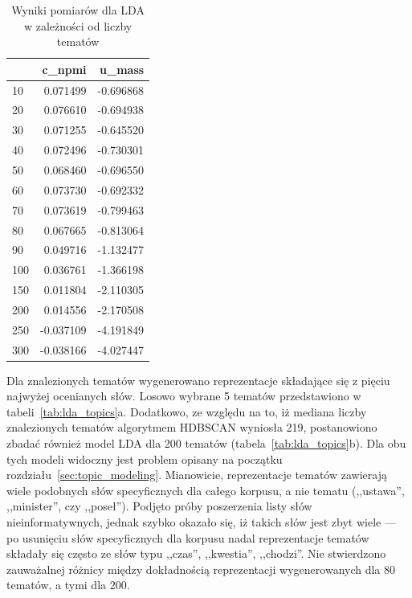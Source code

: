 	\begin{table}[htb]
		\centering
		\caption{Wyniki pomiarów dla LDA w zależności od liczby tematów}\label{tab:lda_scores}
		\begin{tabular}{lrr}
			\toprule
			{} &    c\_npmi &    u\_mass \\
			\midrule
			10  &  0.071499 & -0.696868 \\
			20  &  0.076610 & -0.694938 \\
			30  &  0.071255 & -0.645520 \\
			40  &  0.072496 & -0.730301 \\
			50  &  0.068460 & -0.696550 \\
			60  &  0.073730 & -0.692332 \\
			70  &  0.073619 & -0.799463 \\
			80  &  0.067665 & -0.813064 \\
			90  &  0.049716 & -1.132477 \\
			100 &  0.036761 & -1.366198 \\
			150 &  0.011804 & -2.110305 \\
			200 &  0.014556 & -2.170508 \\
			250 & -0.037109 & -4.191849 \\
			300 & -0.038166 & -4.027447 \\
			\bottomrule
		\end{tabular}
	\end{table}

	Dla znalezionych tematów wygenerowano reprezentacje składające się z pięciu najwyżej ocenianych słów.
	Losowo wybrane 5 tematów przedstawiono w tabeli~\ref{tab:lda_topics}a.
	Dodatkowo, ze względu na to, iż mediana liczby znalezionych tematów algorytmem HDBSCAN wyniosła 219,
		postanowiono zbadać również model LDA dla 200 tematów (tabela~\ref{tab:lda_topics}b).
	Dla obu tych modeli widoczny jest problem opisany na początku rozdziału~\ref{sec:topic_modeling}.
	Mianowicie, reprezentacje tematów zawierają wiele podobnych słów specyficznych dla całego korpusu, a nie tematu (,,ustawa'', ,,minister'', czy ,,poseł'').
	Podjęto próby poszerzenia listy słów nieinformatywnych, jednak szybko okazało się, iż takich słów jest zbyt wiele
		--- po usunięciu słów specyficznych dla korpusu nadal reprezentacje tematów składały się często ze słów typu ,,czas'', ,,kwestia'', ,,chodzi''.
	Nie stwierdzono zauważalnej różnicy między dokładnością reprezentacji wygenerowanych dla 80 tematów, a tymi dla 200.
	
